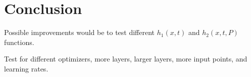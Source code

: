 \section{Conclusion}


Possible improvements would be to test different $h_1(x,t)$ and $h_2(x,t,P)$ functions.

Test for different optimizers, more layers, larger layers, more input points, and learning rates.